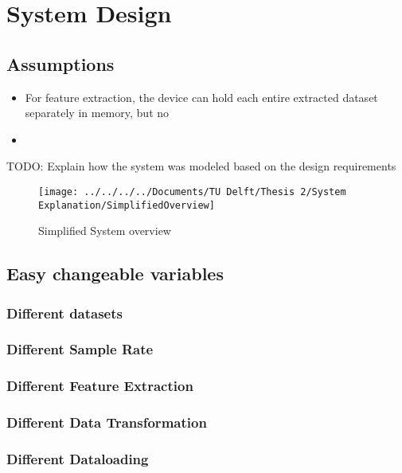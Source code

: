 \chapter{System Design}



\section{Assumptions}

\begin{itemize}
	\item For feature extraction, the device can hold each entire extracted dataset separately in memory, but no 
	\item 
\end{itemize}


TODO: Explain how the system was modeled based on the design requirements

\begin{figure}[h]
	\centering
	\texttt{[image: ../../../../Documents/TU Delft/Thesis 2/System Explanation/SimplifiedOverview]}
	\caption{Simplified System overview}
\end{figure}


\section{Easy changeable variables}

\subsection{Different datasets}

\subsection{Different Sample Rate}

\subsection{Different Feature Extraction}

\subsection{Different Data Transformation}

\subsection{Different Dataloading}

